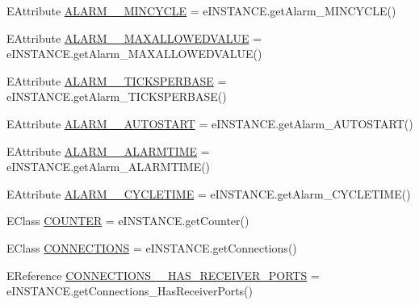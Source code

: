 \begin{DoxyCompactItemize}
\item 
E\-Attribute \hyperlink{interfaceshootingmachineemfmodel_1_1_shootingmachineemfmodel_package_1_1_literals_af6054f8b507a7d0ca60b2bd50a5aa084}{A\-L\-A\-R\-M\-\_\-\-\_\-\-M\-I\-N\-C\-Y\-C\-L\-E} = e\-I\-N\-S\-T\-A\-N\-C\-E.\-get\-Alarm\-\_\-\-M\-I\-N\-C\-Y\-C\-L\-E()
\item 
E\-Attribute \hyperlink{interfaceshootingmachineemfmodel_1_1_shootingmachineemfmodel_package_1_1_literals_ac3fcd2fabc29d8b2bd8fe7c20e77a35c}{A\-L\-A\-R\-M\-\_\-\-\_\-\-M\-A\-X\-A\-L\-L\-O\-W\-E\-D\-V\-A\-L\-U\-E} = e\-I\-N\-S\-T\-A\-N\-C\-E.\-get\-Alarm\-\_\-\-M\-A\-X\-A\-L\-L\-O\-W\-E\-D\-V\-A\-L\-U\-E()
\item 
E\-Attribute \hyperlink{interfaceshootingmachineemfmodel_1_1_shootingmachineemfmodel_package_1_1_literals_a39b5fb0f41af6418c8fce9f9311d818d}{A\-L\-A\-R\-M\-\_\-\-\_\-\-T\-I\-C\-K\-S\-P\-E\-R\-B\-A\-S\-E} = e\-I\-N\-S\-T\-A\-N\-C\-E.\-get\-Alarm\-\_\-\-T\-I\-C\-K\-S\-P\-E\-R\-B\-A\-S\-E()
\item 
E\-Attribute \hyperlink{interfaceshootingmachineemfmodel_1_1_shootingmachineemfmodel_package_1_1_literals_a18cfa31e4eebfe9cb41fabca8febd495}{A\-L\-A\-R\-M\-\_\-\-\_\-\-A\-U\-T\-O\-S\-T\-A\-R\-T} = e\-I\-N\-S\-T\-A\-N\-C\-E.\-get\-Alarm\-\_\-\-A\-U\-T\-O\-S\-T\-A\-R\-T()
\item 
E\-Attribute \hyperlink{interfaceshootingmachineemfmodel_1_1_shootingmachineemfmodel_package_1_1_literals_a17abebf837e070e79742d36847ad9d59}{A\-L\-A\-R\-M\-\_\-\-\_\-\-A\-L\-A\-R\-M\-T\-I\-M\-E} = e\-I\-N\-S\-T\-A\-N\-C\-E.\-get\-Alarm\-\_\-\-A\-L\-A\-R\-M\-T\-I\-M\-E()
\item 
E\-Attribute \hyperlink{interfaceshootingmachineemfmodel_1_1_shootingmachineemfmodel_package_1_1_literals_a189117454c5bcbfea11c8b4ad0f7c191}{A\-L\-A\-R\-M\-\_\-\-\_\-\-C\-Y\-C\-L\-E\-T\-I\-M\-E} = e\-I\-N\-S\-T\-A\-N\-C\-E.\-get\-Alarm\-\_\-\-C\-Y\-C\-L\-E\-T\-I\-M\-E()
\item 
E\-Class \hyperlink{interfaceshootingmachineemfmodel_1_1_shootingmachineemfmodel_package_1_1_literals_a771d1b163661cd049044d3f887529d1f}{C\-O\-U\-N\-T\-E\-R} = e\-I\-N\-S\-T\-A\-N\-C\-E.\-get\-Counter()
\item 
E\-Class \hyperlink{interfaceshootingmachineemfmodel_1_1_shootingmachineemfmodel_package_1_1_literals_a9c8a1d573b9fd4d43bc01144a0a93f1f}{C\-O\-N\-N\-E\-C\-T\-I\-O\-N\-S} = e\-I\-N\-S\-T\-A\-N\-C\-E.\-get\-Connections()
\item 
E\-Reference \hyperlink{interfaceshootingmachineemfmodel_1_1_shootingmachineemfmodel_package_1_1_literals_a8be91145fa16d8559da3a9e953daa74b}{C\-O\-N\-N\-E\-C\-T\-I\-O\-N\-S\-\_\-\-\_\-\-H\-A\-S\-\_\-\-R\-E\-C\-E\-I\-V\-E\-R\-\_\-\-P\-O\-R\-T\-S} = e\-I\-N\-S\-T\-A\-N\-C\-E.\-get\-Connections\-\_\-\-Has\-Receiver\-Ports()

\end{DoxyCompactItemize}
